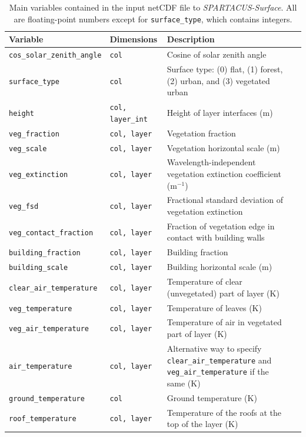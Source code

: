 \documentclass[a4,oneside]{article}
\def\tablesetup{\rowcolors{2}{light-gray}{light-gray}\footnotesize}
\def\codesize{\small}
\def\codetabsize{\footnotesize}
\def\spsurf{\emph{SPARTACUS-Surface}}
\def\code#1{{\codesize\texttt{#1}}}
\def\codetab#1{{\codetabsize\texttt{#1}}}
\begin{document}
\pagebreak
\begin{center}
\tablesetup
\begin{longtable}{llLp{8cm}}%
\caption{\label{tab:invar}Main variables contained in the input netCDF
  file to \spsurf. All are floating-point numbers except for
  \code{surface\_type}, which contains integers.}\\
%
\hline
Variable & Dimensions & Description \\
\hline
\codetab{cos\_solar\_zenith\_angle} & \codetab{col} & Cosine of solar zenith angle \\
\codetab{surface\_type} & \codetab{col} & Surface type: (0) flat, (1) forest, (2) urban, and (3) vegetated urban \\
\codetab{height} & \codetab{col, layer\_int} & Height of layer interfaces (m) \\
\codetab{veg\_fraction} & \codetab{col, layer} & Vegetation fraction \\
\codetab{veg\_scale} & \codetab{col, layer} & Vegetation horizontal scale (m) \\
\codetab{veg\_extinction} & \codetab{col, layer} & Wavelength-independent vegetation extinction coefficient (m$^{-1}$) \\
\codetab{veg\_fsd} & \codetab{col, layer} & Fractional standard deviation of vegetation extinction \\
\codetab{veg\_contact\_fraction} & \codetab{col, layer} & Fraction of vegetation edge in contact with building walls \\
%
\codetab{building\_fraction} & \codetab{col, layer} & Building fraction \\
\codetab{building\_scale} & \codetab{col, layer} & Building horizontal scale (m) \\
%
\codetab{clear\_air\_temperature} & \codetab{col, layer} & Temperature of clear (unvegetated) part of layer (K) \\
\codetab{veg\_temperature} & \codetab{col, layer} & Temperature of leaves (K) \\
\codetab{veg\_air\_temperature} & \codetab{col, layer} & Temperature of air in vegetated part of layer (K) \\
\codetab{air\_temperature} & \codetab{col, layer} & Alternative way to specify \codetab{clear\_air\_temperature} and \codetab{veg\_air\_temperature} if the same (K) \\
\codetab{ground\_temperature} & \codetab{col} & Ground temperature (K) \\
\codetab{roof\_temperature} & \codetab{col, layer} & Temperature of the roofs at the top of the layer (K) \\

\end{longtable}
\end{center}
\end{document}

